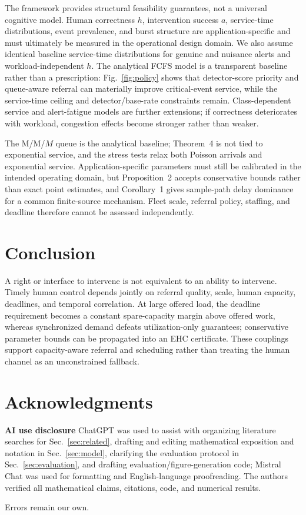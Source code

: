 \documentclass[letterpaper,10pt,conference]{ieeeconf}
\begin{document}
The framework provides structural feasibility guarantees, not a universal cognitive model. Human correctness \(h\), intervention success \(a\), service-time distributions, event prevalence, and burst structure are application-specific and must ultimately be measured in the operational design domain. We also assume identical baseline service-time distributions for genuine and nuisance alerts and workload-independent \(h\). The analytical FCFS model is a transparent baseline rather than a prescription: Fig.~\ref{fig:policy} shows that detector-score priority and queue-aware referral can materially improve critical-event service, while the service-time ceiling and detector/base-rate constraints remain. Class-dependent service and alert-fatigue models are further extensions; if correctness deteriorates with workload, congestion effects become stronger rather than weaker.

The M/M/\(M\) queue is the analytical baseline; Theorem~4 is not tied to
exponential service, and the stress tests relax both Poisson arrivals and
exponential service. Application-specific parameters must still be calibrated
in the intended operating domain, but Proposition~2 accepts conservative bounds
rather than exact point estimates, and Corollary~1 gives sample-path delay
dominance for a common finite-source mechanism. Fleet scale, referral policy,
staffing, and deadline therefore cannot be assessed independently.

\section{Conclusion}

A right or interface to intervene is not equivalent to an ability to intervene. Timely human control depends jointly on referral quality, scale, human capacity, deadlines, and temporal correlation. At large offered load, the deadline requirement becomes a constant spare-capacity margin above offered work, whereas synchronized demand defeats utilization-only guarantees; conservative parameter bounds can be propagated into an EHC certificate. These couplings support capacity-aware referral and scheduling rather than treating the human channel as an unconstrained fallback.

\section*{Acknowledgments}

\textbf{AI use disclosure} ChatGPT was used to assist with organizing literature searches for Sec.~\ref{sec:related}, drafting and editing mathematical exposition and notation in Sec.~\ref{sec:model}, clarifying the evaluation protocol in Sec.~\ref{sec:evaluation}, and drafting evaluation/figure-generation code; Mistral Chat was used for formatting and English-language proofreading. The authors verified all mathematical claims, citations, code, and numerical results.

Errors remain our own.



\end{document}
